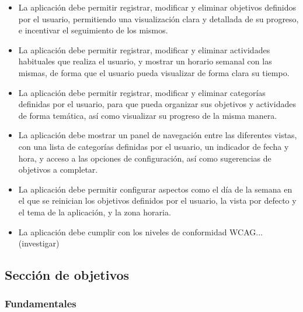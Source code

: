 \documentclass[10pt, a4paper]{aqademic}
\begin{document}
\begin{itemize}
	\item La aplicación debe permitir registrar, modificar y eliminar objetivos definidos por el usuario, permitiendo una visualización clara y detallada de su progreso, e incentivar el seguimiento de los mismos.
	
	\item La aplicación debe permitir registrar, modificar y eliminar actividades habituales que realiza el usuario, y mostrar un horario semanal con las mismas, de forma que el usuario pueda visualizar de forma clara su tiempo.
	
	\item La aplicación debe permitir registrar, modificar y eliminar categorías definidas por el usuario, para que pueda organizar sus objetivos y actividades de forma temática, así como visualizar su progreso de la misma manera.
	
	\item La aplicación debe mostrar un panel de navegación entre las diferentes vistas, con una lista de categorías definidas por el usuario, un indicador de fecha y hora, y acceso a las opciones de configuración, así como sugerencias de objetivos a completar.
	
	\item La aplicación debe permitir configurar aspectos como el día de la semana en el que se reinician los objetivos definidos por el usuario, la vista por defecto y el tema de la aplicación, y la zona horaria.
	
	\item La aplicación debe cumplir con los niveles de conformidad WCAG... (investigar)
\end{itemize}


\subsection*{Sección de objetivos}

\subsubsection*{Fundamentales}
\end{document}
